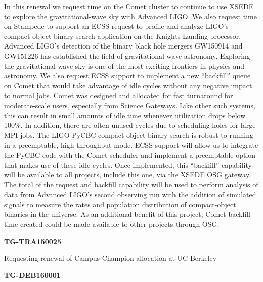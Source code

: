 In this renewal we request time on the Comet cluster to continue to use
XSEDE to explore the gravitational-wave sky with Advanced LIGO. We also
request time on Stampede to support an ECSS request to profile and
analyze LIGO's compact-object binary search application on the Knights
Landing processor. Advanced LIGO's detection of the binary black hole
mergers GW150914 and GW151226 has established the field of
gravitational-wave astronomy. Exploring the gravitational-wave sky is
one of the most exciting frontiers in physics and astronomy. We also
request ECSS support to implement a new ``backfill'' queue on Comet that
would take advantage of idle cycles without any negative impact to
normal jobs. Comet was designed and allocated for fast turnaround for
moderate-scale users, especially from Science Gateways. Like other such
systems, this can result in small amounts of idle time whenever
utilization drops below 100\%. In addition, there are often unused
cycles due to scheduling holes for large MPI jobs. The LIGO PyCBC
compact-object binary search is robust to running in a preemptable,
high-throughput mode. ECSS support will allow us to integrate the PyCBC
code with the Comet scheduler and implement a preemptable option that
makes use of these idle cycles. Once implemented, this ``backfill''
capability will be available to all projects, include this one, via the
XSEDE OSG gateway. The total of the request and backfill capability will
be used to perform analysis of data from Advanced LIGO's second
observing run with the addition of simulated signals to measure the
rates and population distribution of compact-object binaries in the
universe. As an additional benefit of this project, Comet backfill time
created could be made available to other projects through OSG.

\textbf{TG-TRA150025}

Requesting renewal of Campus Champion allocation at UC Berkeley

\textbf{TG-DEB160001}

